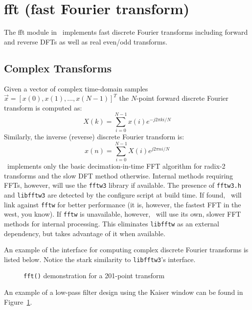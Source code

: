 % 
%

\newpage
\section{fft (fast Fourier transform)}
\label{module:fft}
%
The fft module in \liquid\ implements fast discrete Fourier transforms
including forward and reverse DFTs as well as real even/odd transforms.

\subsection{Complex Transforms}
\label{module:fft:dft}
Given a vector of complex time-domain samples
$\vec{x} = \left[x(0),x(1),\ldots,x(N-1)\right]^T$
the $N$-point forward discrete Fourier transform is computed as:
%
\begin{equation}
\label{eqn:fft:dft}
    X(k) = \sum_{i=0}^{N-1}{x(i) e^{-j 2 \pi k i/N}}
\end{equation}
%
Similarly, the inverse (reverse) discrete Fourier transform is:
\begin{equation}
\label{eqn:fft:idft}
    x(n) = \sum_{i=0}^{N-1}{X(i) e^{ j 2 \pi n i/N}}
\end{equation}
%
\liquid\ implements only the basic decimation-in-time FFT algorithm for
radix-2 transforms and the slow DFT method otherwise.
Internal methods requiring FFTs, however, will use the {\tt fftw3}
library \cite{fftw:web} if available.
The presence of {\tt fftw3.h} and {\tt libfftw3} are detected by the
configure script at build time.
If found, \liquid\ will link against {\tt fftw} for better performance
(it is, however, the fastest FFT in the west, you know).
If {\tt fftw} is unavailable, however, \liquid\ will use its own, slower
FFT methods for internal processing.
This eliminates {\tt libfftw} as an external dependency, but takes
advantage of it when available.

An example of the interface for computing complex discrete Fourier
transforms is listed below.
Notice the stark similarity to {\tt libfftw3}'s interface.
%

%
\begin{figure}
\centering
{}
\caption{{\tt fft()} demonstration for a 201-point transform}
\label{fig:module:fft}
\end{figure}
%
An example of a low-pass filter design using the Kaiser window can be
found in Figure~\ref{fig:module:fft}.

